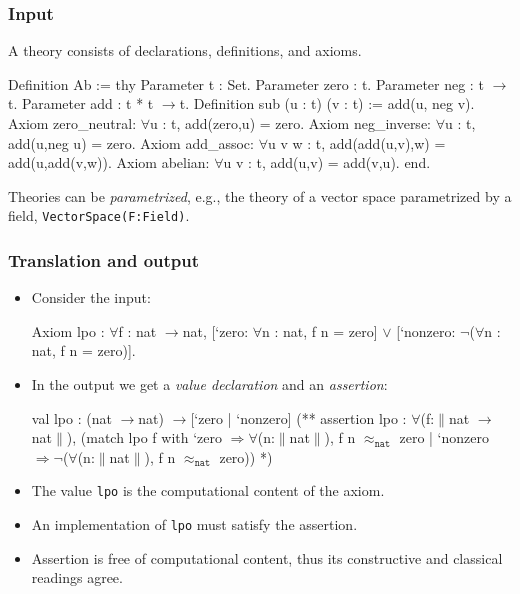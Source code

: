 \documentclass[t]{beamer}
\newcommand{\iTo}{{\ensuremath{\to}}}
\newcommand{\iForall}{$\forall$}
\newcommand{\iOr}{$\lor$}
\newcommand{\iImply}{$\Rightarrow$}
\newcommand{\iNot}{$\lnot$}
\newcommand{\iT}[1]{$\|$#1$\|$}
\newcommand{\iPer}[1]{$\approx_{\mathtt{#1}}$}
\begin{document}
\begin{frame}[fragile]
  \frametitle{Input}

  A theory consists of declarations, definitions, and axioms.

\begin{source}
Definition Ab :=
thy
  Parameter t : Set.
  Parameter zero : t.
  Parameter neg : t \iTo t.
  Parameter add : t * t \iTo t.
  Definition sub (u : t) (v : t) := add(u, neg v).
  Axiom zero_neutral: \iForall u : t, add(zero,u) = zero.
  Axiom neg_inverse: \iForall u : t, add(u,neg u) = zero.
  Axiom add_assoc:
   \iForall u v w : t, add(add(u,v),w) = add(u,add(v,w)).
  Axiom abelian: \iForall u v : t, add(u,v) = add(v,u).
end.    
\end{source}

Theories can be \emph{parametrized}, e.g., the theory of a vector
space parametrized by a field, \texttt{VectorSpace(F:Field)}.

\end{frame}


\begin{frame}[fragile]
  \frametitle{Translation and output}

\begin{itemize}[<+->]
\item
  Consider the input:
\begin{source}
Axiom lpo : \iForall f : nat \iTo nat,
  [`zero: \iForall n : nat, f n = zero] \iOr
  [`nonzero: \iNot (\iForall n : nat, f n = zero)].    
\end{source}

\item
  In the output we get a \emph{value declaration} and an \emph{assertion}:
%
\begin{source}
val lpo : (nat \iTo nat) \iTo [`zero | `nonzero]
(**  assertion lpo : 
  \iForall (f:\iT{nat \iTo nat}), 
    (match lpo f with
       `zero \iImply \iForall (n:\iT{nat}), f n \iPer{nat} zero 
     | `nonzero \iImply \iNot (\iForall (n:\iT{nat}), f n \iPer{nat} zero))
*)
\end{source}
\item The value \texttt{lpo} is the computational content of the axiom.
\item An implementation of \texttt{lpo} must satisfy the assertion.
\item Assertion is free of computational content, thus its
  constructive and classical readings agree.
\end{itemize}

\end{frame}
\end{document}
